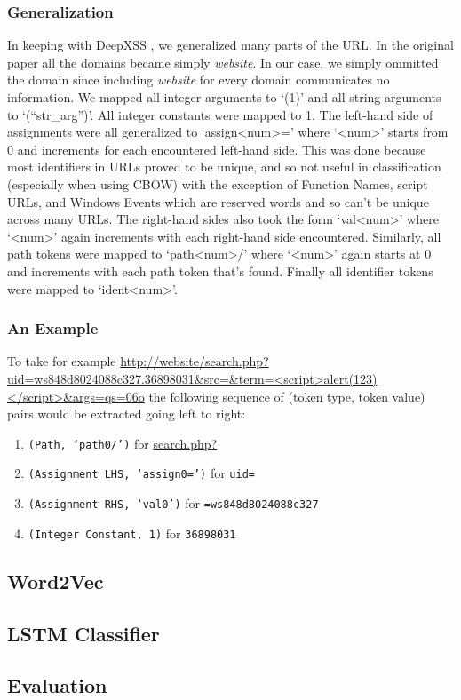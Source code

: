 \subsubsection{Generalization}
In keeping with DeepXSS \cite{fang2018deepxss}, we generalized many parts of the URL. In the original paper all the domains became simply \textit{website}. In our case, we simply ommitted the domain since including \textit{website} for every domain communicates no information. We mapped all integer arguments to `(1)' and all string arguments to `(``str\_arg'')'. All integer constants were mapped to 1. The left-hand side of assignments were all generalized to `assign<num>=' where `<num>' starts from 0 and increments for each encountered left-hand side. This was done because most identifiers in URLs proved to be unique, and so not useful in classification (especially when using CBOW) with the exception of Function Names, script URLs, and Windows Events which are reserved words and so can't be unique across many URLs. The right-hand sides also took the form `val<num>' where `<num>' again increments with each right-hand side encountered. Similarly, all path tokens were mapped to `path<num>/' where `<num>' again starts at 0 and increments with each path token that's found. Finally all identifier tokens were mapped to `ident<num>'.


\subsubsection{An Example}
To take for example \url{http://website/search.php?uid=ws848d8024088c327.36898031\&src=\&term=<script>alert(123)</script>\&args=qs=06o} the following sequence of (token type, token value) pairs would be extracted going left to right:

\begin{enumerate}
\item \texttt{(Path, `path0/')} for \url{search.php?}
\item \texttt{(Assignment LHS, `assign0=')} for \texttt{uid=}
\item \texttt{(Assignment RHS, `val0')} for \texttt{=ws848d8024088c327}
\item \texttt{(Integer Constant, 1)} for \texttt{36898031}
\end{enumerate}


\subsection{Word2Vec}



\subsection{LSTM Classifier}



\subsection{Evaluation}